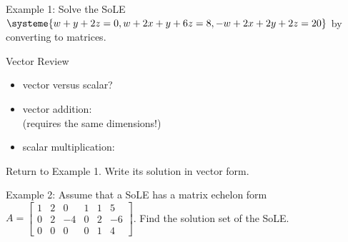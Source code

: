 \documentclass[11pt,fleqn]{article}
\begin{document}
\noindent\hrulefill

\quad

Example 1: Solve the SoLE $\systeme{w+y+2z=0,w+2x+y+6z=8,-w+2x+2y+2z=20}$ by converting to matrices.

\newpage
 Vector Review\\
 \begin{itemize}
  \item vector versus scalar?\\
 
\item vector addition:\\
 
 (requires the same dimensions!)\\
 
 \item scalar multiplication:\\
 \vspace{0.6in}
 \end{itemize}

Return to Example 1. Write its solution in vector form.\\

\vspace{2in}

Example 2: Assume that a SoLE has a matrix echelon form $A=\begin{bmatrix} 1&2&0&1&1&5\\ 0&2&-4&0&2&-6\\ 0&0&0&0&1&4\end{bmatrix}$. Find the solution set of the SoLE.
\vfill
\end{document}
